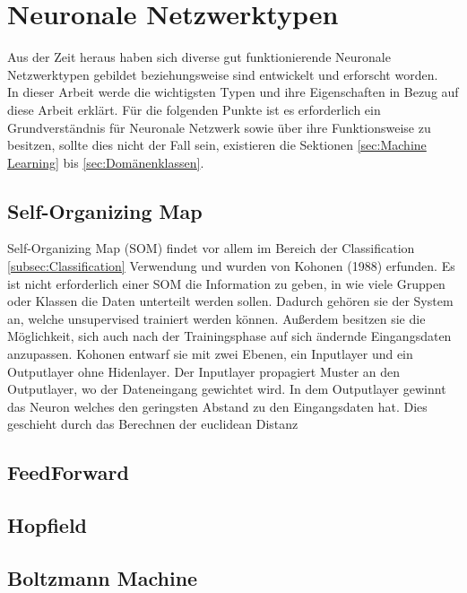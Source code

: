 
\section{Neuronale Netzwerktypen}

Aus der Zeit heraus haben sich diverse gut funktionierende Neuronale Netzwerktypen gebildet beziehungsweise sind entwickelt und erforscht worden. \\

In dieser Arbeit werde die wichtigsten Typen und ihre Eigenschaften in Bezug auf diese Arbeit erklärt. 
Für die folgenden Punkte ist es erforderlich ein Grundverständnis für Neuronale Netzwerk sowie über ihre Funktionsweise zu besitzen, sollte dies nicht der Fall sein, existieren die Sektionen \ref{sec:Machine Learning} bis \ref{sec:Domänenklassen}.

\subsection{Self-Organizing Map}

Self-Organizing Map (SOM) findet vor allem im Bereich der Classification  \ref{subsec:Classification} Verwendung und wurden von Kohonen (1988) erfunden. 
Es ist nicht erforderlich einer SOM die Information zu geben, in wie viele Gruppen oder Klassen die Daten unterteilt werden sollen. 
Dadurch gehören sie der System an, welche unsupervised trainiert werden können. 
Außerdem besitzen sie die Möglichkeit, sich auch nach der Trainingsphase auf sich ändernde Eingangsdaten anzupassen. 
Kohonen entwarf sie mit zwei Ebenen, ein Inputlayer und ein Outputlayer ohne Hidenlayer. 
Der Inputlayer propagiert Muster an den Outputlayer, wo der Dateneingang gewichtet wird. 
In dem Outputlayer gewinnt das Neuron welches den geringsten Abstand zu den Eingangsdaten hat.
Dies geschieht durch das Berechnen der euclidean Distanz


\subsection{FeedForward}

\subsection{Hopfield}

\subsection{Boltzmann Machine}

